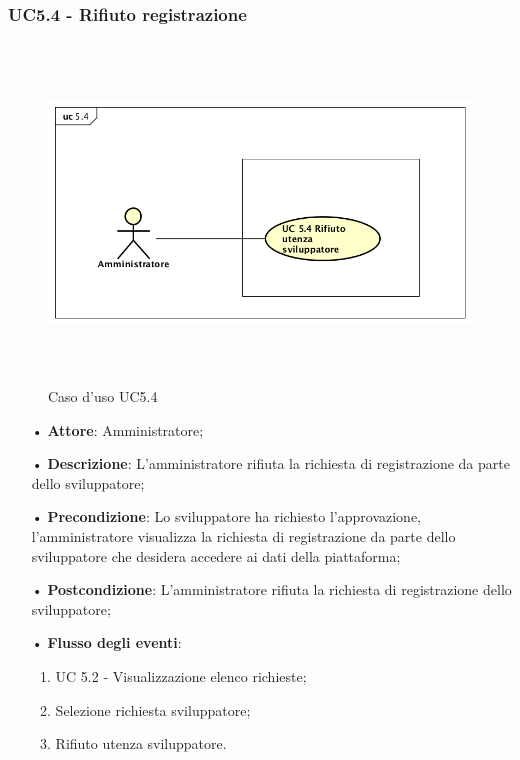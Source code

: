\subsubsection{UC5.4 - Rifiuto registrazione}

\begin{figure}[H]
\centering
\includegraphics[width=17cm, height=9cm]{img/UC54.png} 
\caption{Caso d'uso UC5.4}
\end{figure}


\begin{itemize}
\item[•] \textbf{Attore}: Amministratore;

\item[•] \textbf{Descrizione}: L’amministratore rifiuta la richiesta di registrazione da parte dello sviluppatore;

\item[•] \textbf{Precondizione}: Lo sviluppatore ha richiesto l'approvazione, l'amministratore visualizza la richiesta di registrazione da parte dello sviluppatore che desidera accedere ai dati della piattaforma;

\item[•] \textbf{Postcondizione}: L'amministratore rifiuta la richiesta di registrazione dello sviluppatore;

\item[•] \textbf{Flusso degli eventi}:

\begin{enumerate}

\item UC 5.2 - Visualizzazione elenco richieste;

\item Selezione richiesta sviluppatore;

\item Rifiuto utenza sviluppatore.

\end{enumerate}
\end{itemize}
